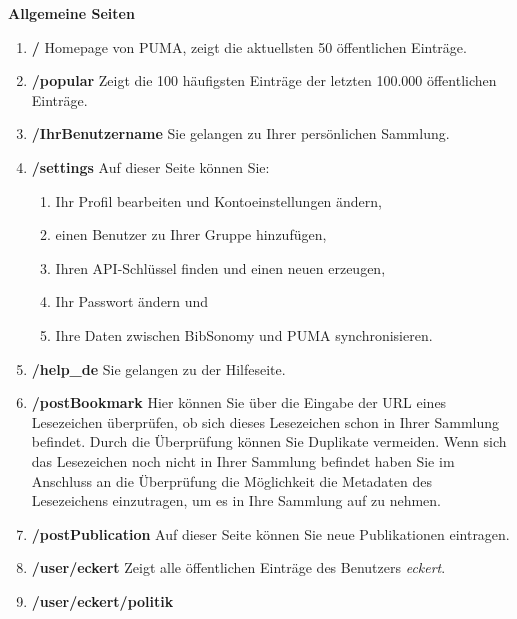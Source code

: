 \documentclass[b5paper,11pt,twoside]{scrbook} %
\begin{document}
\newline
\textbf{Allgemeine Seiten}
\begin{enumerate}
    \item \textbf{/} \newline
    Homepage von PUMA, zeigt die aktuellsten 50 öffentlichen Einträge.
    \item \textbf{/popular} \newline
    Zeigt die 100 häufigsten Einträge der letzten 100.000 öffentlichen Einträge.
    \item \textbf{/IhrBenutzername} \newline
    Sie gelangen zu Ihrer persönlichen Sammlung.
    \item \textbf{/settings} \newline
    Auf dieser Seite können Sie:
    \begin{enumerate}
        \item Ihr Profil bearbeiten und Kontoeinstellungen ändern,
        \item einen Benutzer zu Ihrer Gruppe hinzufügen,
        \item Ihren API-Schlüssel finden und einen neuen erzeugen,
        \item Ihr Passwort ändern und
        \item Ihre Daten zwischen BibSonomy und PUMA synchronisieren.
    \end{enumerate}
    \item \textbf{/help\_de} \newline
    Sie gelangen zu der Hilfeseite.
    \item \textbf{/postBookmark} \newline
    Hier können Sie über die Eingabe der URL eines Lesezeichen überprüfen, ob sich dieses Lesezeichen schon in Ihrer Sammlung befindet. Durch die Überprüfung können Sie Duplikate vermeiden. Wenn sich das Lesezeichen noch nicht in Ihrer Sammlung befindet haben Sie im Anschluss an die Überprüfung die Möglichkeit die Metadaten des Lesezeichens einzutragen, um es in Ihre Sammlung auf zu nehmen.
    \item \textbf{/postPublication} \newline
    Auf dieser Seite können Sie neue Publikationen eintragen. 
    \item \textbf{/user/eckert} \newline
    Zeigt alle öffentlichen Einträge des Benutzers \textit{eckert}.
    \item \textbf{/user/eckert/politik} \newline

\end{enumerate}
\end{document}

